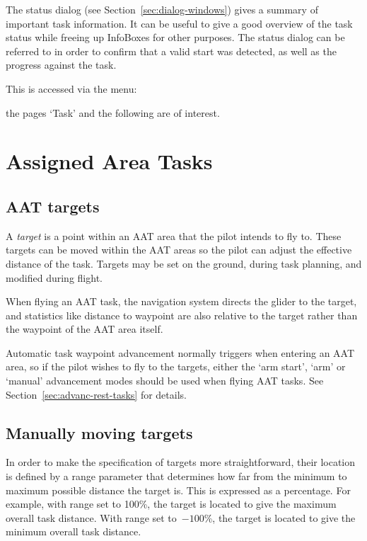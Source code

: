 \documentclass[a4paper,12pt]{refrep}
\begin{document}
The status dialog (see Section~\ref{sec:dialog-windows}) gives a
summary of important task information.  It can be useful to give a
good overview of the task status while freeing up InfoBoxes for other
purposes.  The status dialog can be referred to in order to confirm
that a valid start was detected, as well as the progress against the
task.

This is accessed via the menu:
\begin{quote}
\blink{}\blink{}
\end{quote}
the pages `Task' and the following are of interest.

\section{Assigned Area Tasks}\label{sec:aat-tasks}

\subsection*{AAT targets}

A {\em target} is a point within an AAT area that the pilot intends to
fly to.  These targets can be moved within the AAT areas so the pilot
can adjust the effective distance of the task.  Targets may be set on
the ground, during task planning, and modified during flight.

When flying an AAT task, the navigation system directs the glider to
the target, and statistics like distance to waypoint are also relative
to the target rather than the waypoint of the AAT area itself.

Automatic task waypoint advancement normally triggers when entering an
AAT area, so if the pilot wishes to fly to the targets, either the
`arm start', `arm' or `manual' advancement modes should be used when
flying AAT tasks.  See Section~\ref{sec:advanc-rest-tasks} for
details. 

\subsection*{Manually moving targets}

In order to make the specification of targets more straightforward,
their location is defined by a range parameter that determines how
far from the minimum to maximum possible distance the target is.  This
is expressed as a percentage.  For example, with range set to 100\%,
the target is located to give the maximum overall task distance.  With
range set to~$-100$\%, the target is located to give the minimum overall
task distance.  
\end{document}
